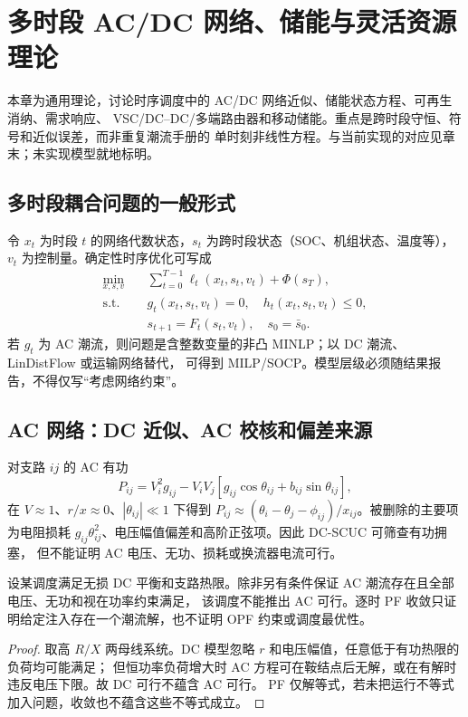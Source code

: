 
\section{多时段 AC/DC 网络、储能与灵活资源理论}\label{sec:ts-th-network}

\begin{theorynote}
本章为通用理论，讨论时序调度中的 AC/DC 网络近似、储能状态方程、可再生消纳、需求响应、
VSC/DC--DC/多端路由器和移动储能。重点是跨时段守恒、符号和近似误差，而非重复潮流手册的
单时刻非线性方程。与当前实现的对应见章末；未实现模型就地标明。
\end{theorynote}

\subsection{多时段耦合问题的一般形式}
令 $x_t$ 为时段 $t$ 的网络代数状态，$s_t$ 为跨时段状态（SOC、机组状态、温度等），
$v_t$ 为控制量。确定性时序优化可写成
\begin{align}
\min_{x,s,v}\quad&\sum_{t=0}^{T-1}\ell_t(x_t,s_t,v_t)+\Phi(s_T),\label{eq:ts-ocp-obj}\\
\text{s.t.}\quad&g_t(x_t,s_t,v_t)=0,\quad h_t(x_t,s_t,v_t)\le0,\label{eq:ts-ocp-net}\\
&s_{t+1}=F_t(s_t,v_t),\quad s_0=\bar s_0.\label{eq:ts-ocp-state}
\end{align}
若 $g_t$ 为 AC 潮流，则问题是含整数变量的非凸 MINLP；以 DC 潮流、LinDistFlow 或运输网络替代，
可得到 MILP/SOCP。模型层级必须随结果报告，不得仅写“考虑网络约束”。

\subsection{AC 网络：DC 近似、AC 校核和偏差来源}
对支路 $ij$ 的 AC 有功
\begin{equation}
P_{ij}=V_i^2g_{ij}-V_iV_j[g_{ij}\cos\theta_{ij}+b_{ij}\sin\theta_{ij}],\label{eq:ts-acbranch}
\end{equation}
在 $V\approx1$、$r/x\approx0$、$|\theta_{ij}|\ll1$ 下得到
$P_{ij}\approx(\theta_i-\theta_j-\phi_{ij})/x_{ij}$。被删除的主要项为电阻损耗
$g_{ij}\theta_{ij}^2$、电压幅值偏差和高阶正弦项。因此 DC-SCUC 可筛查有功拥塞，
但不能证明 AC 电压、无功、损耗或换流器电流可行。

\begin{proposition}[UC--PF 校核不是等价证明]\label{prop:ts-ucpf}
设某调度满足无损 DC 平衡和支路热限。除非另有条件保证 AC 潮流存在且全部电压、无功和视在功率约束满足，
该调度不能推出 AC 可行。逐时 PF 收敛只证明给定注入存在一个潮流解，也不证明 OPF 约束或调度最优性。
\end{proposition}
\begin{proof}
取高 $R/X$ 两母线系统。DC 模型忽略 $r$ 和电压幅值，任意低于有功热限的负荷均可能满足；
但恒功率负荷增大时 AC 方程可在鞍结点后无解，或在有解时违反电压下限。故 DC 可行不蕴含 AC 可行。
PF 仅解等式，若未把运行不等式加入问题，收敛也不蕴含这些不等式成立。
\end{proof}

